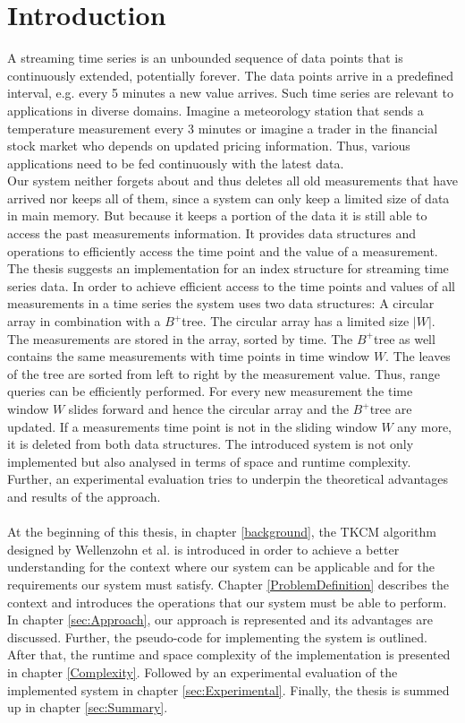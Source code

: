 \documentclass[abstracton,12pt]{scrreprt}
\begin{document}
\chapter{Introduction}
A streaming time series is an unbounded sequence of data points that is continuously extended, potentially forever. The data points arrive in a predefined interval, e.g. every 5 minutes a new value arrives. Such time series are relevant to applications in diverse domains. Imagine a meteorology station that sends a temperature measurement every 3 minutes or imagine a trader in the financial stock market who depends on updated pricing information. Thus, various applications need to be fed continuously with the latest data. \\
Our system neither forgets about and thus deletes all old measurements that have arrived nor keeps all of them, since a system can only keep a limited size of data in main memory. But because it keeps a portion of the data it is still able to access the past measurements information. It provides data structures and operations to efficiently access the time point and the value of a measurement.\\
The thesis suggests an implementation for an index structure for streaming time series data. In order to achieve efficient access to the time points and values of all measurements in a time series the system uses two data structures: A circular array in combination with a $B^+$tree. The circular array has a limited size $|W|$. The measurements are stored in the array, sorted by time. The $B^+$tree as well contains the same measurements with time points in time window $W$. The leaves of the tree are sorted from left to right by the measurement value. Thus, range queries can be efficiently performed. For every new measurement the time window $W$ slides forward and hence the circular array and the $B^+$tree are updated. If a measurements time point is not in the sliding window $W$ any more, it is deleted from both data structures. The introduced system is not only implemented but also analysed in terms of space and runtime complexity. Further, an experimental evaluation tries to underpin the theoretical advantages and results of the approach.
\\ \\
At the beginning of this thesis, in chapter \ref{background}, the TKCM algorithm designed by Wellenzohn et al.\cite{BScT} is introduced in order to achieve a better understanding for the context where our system can be applicable and for the requirements our system must satisfy. Chapter \ref{ProblemDefinition} describes the context and introduces the operations that our system must be able to perform. In chapter \ref{sec:Approach}, our approach is represented and its advantages are discussed. Further, the pseudo-code for implementing the system is outlined. After that, the runtime and space complexity of the implementation is presented in chapter \ref{Complexity}. Followed by an experimental evaluation of the implemented system in chapter \ref{sec:Experimental}. Finally, the thesis is summed up in chapter \ref{sec:Summary}.
\end{document}
